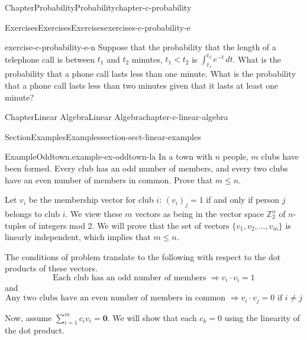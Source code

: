 \documentclass[oneside,10pt,]{book}
\numberwithin{equation}{section}
\renewcommand{\vec}[1]{\mathbf{#1}}
\newcommand{\lt}{<}
\begin{document}
\begin{chapterptx}{Chapter}{Probability}{}{Probability}{}{}{chapter-c-probability}
\begin{exercises-section}{Exercises}{Exercises}{}{Exercises}{}{}{exercises-c-probability-e}
\begin{divisionexercise}{13}{}{}{exercise-c-probability-e-n}
Suppose that the probability that the length of a telephone call is between \(t_1\) and \(t_2\) minutes,  \(t_1 \lt t_2\) is \(\int_{t_1}^{t_2} e^{-t} \, dt\).   What is the probability that a phone call lasts less than one minute.  What is the probability that a phone call lasts less than two minutes given that it lasts at least one minute?%
\end{divisionexercise}%
\end{exercises-section}
\end{chapterptx}
%
%
\typeout{************************************************}
\typeout{************************************************}
%
\begin{chapterptx}{Chapter}{Linear Algebra}{}{Linear Algebra}{}{}{chapter-c-linear-algebra}
\renewcommand*{\chaptername}{Chapter}
%
%
\typeout{************************************************}
\typeout{************************************************}
%
\begin{sectionptx}{Section}{Examples}{}{Examples}{}{}{section-sect-linear-examples}
\begin{example}{Example}{Oddtown.}{example-ex-oddtown-la}%
In a town with \(n\) people, \(m\) clubs have been formed. Every club has an odd number of members, and every two clubs have an even number of members in common. Prove that \(m \leq  n\).%
\par
Let \(v_i\) be the membership vector for club \(i\):  \((v_i)_j = 1\) if and only if person  \(j\) belongs to club \(i\). We view these \(m\) vectors as being in the vector space \(\mathbb{Z}_2^n\) of \(n\)-tuples of integers mod 2.  We will prove that the set of vectors \(\{v_1, v_2, \dots, v_m\}\) is linearly independent, which implies that \(m \leq  n\).%
\par
The conditions of problem translate to the following with respect to the dot products of these vectors.%
\begin{equation*}
\textrm{Each club has an odd number of members }\Rightarrow  v_i\cdot v_i = 1
\end{equation*}
and%
\begin{equation*}
\textrm{Any two clubs have an even number of members in common }\Rightarrow  v_i\cdot v_j = 0 \textrm{ if }i\neq j
\end{equation*}
%
\par
Now, assume  \(\sum_{i=1}^m c_i v_i = \vec{0}\).  We will show that each \(c_k = 0\) using the linearity of the dot product.%
\begin{equation*}

\end{equation*}
\end{example}
\end{sectionptx}
\end{chapterptx}
\end{document}
